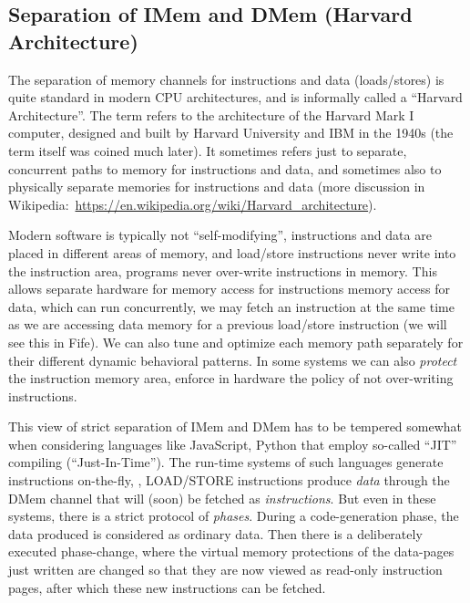 
\subsection{Separation of IMem and DMem (Harvard Architecture)}

\label{Sec_Harvard_architecture}


The separation of memory channels for instructions and data
(loads/stores) is quite standard in modern CPU architectures, and is
informally called a ``Harvard Architecture''.  The term refers to the
architecture of the Harvard Mark I computer, designed and built by
Harvard University and IBM in the 1940s (the term itself was coined
much later).  It sometimes refers just to separate, concurrent paths
to memory for instructions and data, and sometimes also to physically
separate memories for instructions and data (more discussion in
Wikipedia:~\url{https://en.wikipedia.org/wiki/Harvard_architecture}).

Modern software is typically not ``self-modifying'', {\ie}
instructions and data are placed in different areas of memory, and
load/store instructions never write into the instruction area, {\ie}
programs never over-write instructions in memory.  This allows
separate hardware for memory access for instructions {\vs} memory
access for data, which can run concurrently, {\ie} we may fetch an
instruction at the same time as we are accessing data memory for a
previous load/store instruction (we will see this in Fife).  We can
also tune and optimize each memory path separately for their different
dynamic behavioral patterns.  In some systems we can also
\emph{protect} the instruction memory area, {\ie} enforce in hardware
the policy of not over-writing instructions.


This view of strict separation of IMem and DMem has to be tempered
somewhat when considering languages like JavaScript, Python {\etc}
that employ so-called ``JIT'' compiling (``Just-In-Time'').  The
run-time systems of such languages generate instructions on-the-fly,
{\ie}, LOAD/STORE instructions produce \emph{data} through the DMem
channel that will (soon) be fetched as \emph{instructions}.  But even
in these systems, there is a strict protocol of \emph{phases}.  During
a code-generation phase, the data produced is considered as ordinary
data.  Then there is a deliberately executed phase-change, where the
virtual memory protections of the data-pages just written are changed
so that they are now viewed as read-only instruction pages, after
which these new instructions can be fetched.

